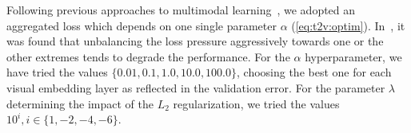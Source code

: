 Following previous approaches to multimodal learning~\cite{feng2014cross,ngiam2011multimodal}, we adopted an aggregated loss which depends on one single parameter $\alpha$ (\ref{eq:t2v:optim}).
In~\cite{feng2014cross}, it was found that unbalancing the loss pressure aggressively towards one or the other extremes tends to degrade the performance.
For the $\alpha$ hyperparameter, we have tried the values $\{0.01, 0.1, 1.0, 10.0, 100.0\}$, choosing the best one for each visual embedding layer as reflected in the validation error.
For the parameter $\lambda$ determining the impact of the $L_2$ regularization, we tried the values $10^i, i\in\{1,-2,-4,-6\}$.



